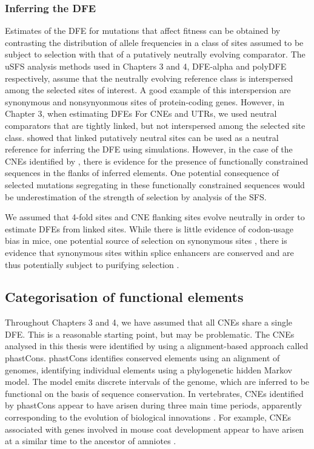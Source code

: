 \subsubsection{Inferring the DFE}
	
	Estimates of the DFE for mutations that affect fitness can be obtained by contrasting the distribution of allele frequencies in a class of sites assumed to be subject to selection with that of a putatively neutrally evolving comparator. The uSFS analysis methods used in Chapters 3 and 4, DFE-alpha and polyDFE respectively, assume that the neutrally evolving reference class is interspersed among the selected sites of interest. A good example of this interspersion are synonymous and nonsynyonmous sites of protein-coding genes. However, in Chapter 3, when estimating DFEs For CNEs and UTRs, we  used neutral comparators that are tightly linked, but not interspersed among the selected site class. \cite{RN178} showed that linked putatively neutral sites can be used as a neutral reference for inferring the DFE using simulations. However, in the case of the CNEs identified by \cite{RN122}, there is evidence for the presence of functionally constrained sequences in the flanks of inferred elements. One potential consequence of selected mutations segregating in these functionally constrained sequences would be underestimation of the strength of selection by analysis of the SFS.
	
	We assumed that 4-fold sites and CNE flanking sites evolve neutrally in order to estimate DFEs from linked sites. While there is little evidence of codon-usage bias in mice, one potential source of selection on synonymous sites \citep{RN195}, there is evidence that synonymous sites within splice enhancers are conserved and are thus potentially subject to purifying selection \citep{RN369}. 
	
\subsection{Categorisation of functional elements}	
	
	Throughout Chapters 3 and 4, we have assumed that all CNEs share a single DFE. This is a reasonable starting point, but may be problematic. The CNEs analysed in this thesis were identified by \cite{RN122} using a alignment-based approach called phastCons. phastCons identifies conserved elements using an alignment of genomes, identifying individual elements using a phylogenetic hidden Markov model. The model emits discrete intervals of the genome, which are inferred to be functional on the basis of sequence conservation. In vertebrates, CNEs identified by phastCons appear to have arisen during three main time periods, apparently corresponding to the evolution of biological innovations \citep{RN353}. For example, CNEs associated with genes involved in mouse coat development appear to have arisen at a similar time to the ancestor of amniotes \citep{RN353}.
	
